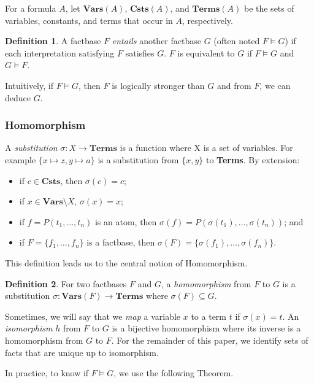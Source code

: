 \documentclass{article}
\theoremstyle{definition}
\newtheorem{definition}{Definition}[section]
\theoremstyle{remark}
\newcommand{\Vars}{\textbf{Vars}}
\newcommand{\Terms}{\textbf{Terms}}
\newcommand{\Csts}{\textbf{Csts}}
\begin{document}
For a formula $A$, let \emph{$\Vars(A)$}, \emph{$\Csts(A)$}, and \emph{$\Terms(A)$} be the sets of variables, constants, and terms that occur in $A$, respectively.

\begin{definition}
A factbase $F$ \emph{entails} another factbase $G$ (often noted $F \models G$) if each interpretation satisfying $F$ satisfies $G$. $F$ is equivalent to $G$ if $F \models G$ and $G \models F$.
\end{definition}

Intuitively, if $F \models G$, then $F$ is logically stronger than $G$ and from $F$, we can deduce $G$.

\subsubsection{Homomorphism}

A \emph{substitution} $\sigma:X \to \Terms$ is a function where X is a set of variables. For example $\{x \mapsto z, y \mapsto a \}$ is a substitution from $\{x,y\}$ to \Terms. By extension: 
\begin{itemize}
\item if $c \in \Csts$, then $\sigma(c) = c$;
\item if $x \in \Vars \setminus X$, $\sigma(x) = x$;
\item if $f = P(t_1,\ldots,t_n)$ is an atom, then $\sigma(f) = P(\sigma(t_1),\ldots,\sigma(t_n))$; and
\item if $F = \{f_1,\ldots,f_n\}$ is a factbase, then $\sigma(F) = \{\sigma(f_1),\ldots,\sigma(f_n)\}$.
\end{itemize}

This definition leads us to the central notion of Homomorphism.

\begin{definition}
For two factbases $F$ and $G$, a \emph{homomorphism} from $F$ to $G$ is a substitution $\sigma:\Vars(F) \to \Terms$ where $\sigma(F) \subseteq G$. 
\end{definition}

Sometimes, we will say that we \emph{map} a variable $x$ to a term $t$ if $\sigma(x)=t$. An \emph{isomorphism} $h$ from $F$ to $G$ is a bijective homomorphism where its inverse is a homomorphism from $G$ to $F$. For the remainder of this paper, we identify sets of facts that are unique up to isomorphism. 

In practice, to know if $F \models G$, we use the following Theorem.
\end{document}
